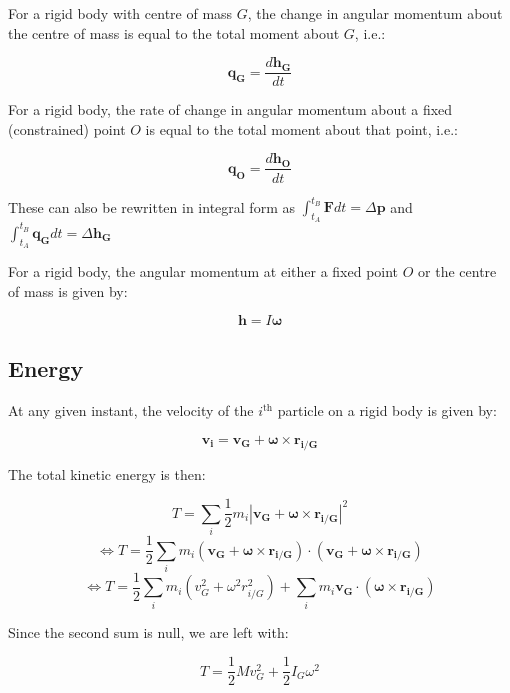 \documentclass[12pt]{article}
\begin{document}
\begin{theorem}
    For a rigid body with centre of mass $G$, the change in angular momentum about the centre of mass is equal to the total moment about $G$, i.e.:

    \[ \mathbf{q_G} = \frac{d\mathbf{h_G}}{dt} \]
\end{theorem}

\begin{theorem}
    For a rigid body, the rate of change in angular momentum about a fixed (constrained) point $O$ is equal to the total moment about that point, i.e.:

    \[ \mathbf{q_O} = \frac{d\mathbf{h_O}}{dt} \]
\end{theorem}

These can also be rewritten in integral form as $\int_{t_A}^{t_B} \mathbf{F}dt = \Delta \mathbf{p}$ and $\int_{t_A}^{t_B} \mathbf{q_G}dt = \Delta \mathbf{h_G}$

\begin{theorem}
    For a rigid body, the angular momentum at either a fixed point $O$ or the centre of mass is given by:

    \[ \mathbf{h} = I\mathbf{\omega} \]
\end{theorem}

\subsection{Energy}

At any given instant, the velocity of the $i^{\text{th}}$ particle on a rigid body is given by:

\[ \mathbf{v_i} = \mathbf{v_G} + \mathbf{\omega} \times \mathbf{r_{i/G}} \]

The total kinetic energy is then:

\[ T = \sum_i \frac{1}{2}m_i\left|\mathbf{v_G} + \mathbf{\omega} \times \mathbf{r_{i/G}}\right|^2 \]
\[ \Leftrightarrow T = \frac{1}{2}\sum_i m_i(\mathbf{v_G} + \mathbf{\omega} \times \mathbf{r_{i/G}})\cdot(\mathbf{v_G} + \mathbf{\omega} \times \mathbf{r_{i/G}}) \]
\[ \Leftrightarrow T = \frac{1}{2}\sum_i m_i(v_G^2 + \omega^2r_{i/G}^2) + \sum_i m_i\mathbf{v_G}\cdot(\mathbf{\omega} \times \mathbf{r_{i/G}}) \]

Since the second sum is null, we are left with:

\[ T = \frac{1}{2}Mv_G^2 + \frac{1}{2}I_G\omega^2 \]
\end{document}
